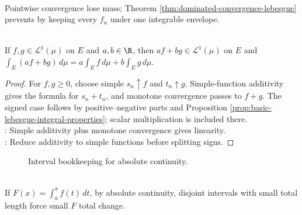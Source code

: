 \begin{perspective} \label{per:domination-as-limit-integral-safeguard} \\
Pointwise convergence lose mass; Theorem \ref{thm:dominated-convergence-lebesgue} prevents by keeping every $f_n$ under one integrable envelope.
\end{perspective}

\begin{proposition} \label{prop:lebesgue-integral-linearity} \\
If $f,g\in\mathscr{L}^1(\mu)$ on $E$ and $a,b\in\R$, then $af+bg\in\mathscr{L}^1(\mu)$ on $E$ and $\int_E(af+bg)\,d\mu=a\int_Ef\,d\mu+b\int_Eg\,d\mu$.
\begin{proof}
For $f,g\geq0$, choose simple $s_n\uparrow f$ and $t_n\uparrow g$. Simple-function additivity gives the formula for $s_n+t_n$, and monotone convergence passes to $f+g$. The signed case follows by positive--negative parts and Proposition \ref{prop:basic-lebesgue-integral-properties}; scalar multiplication is included there.\\
: Simple additivity plus monotone convergence gives linearity.\\
: Reduce additivity to simple functions before splitting signs.
\end{proof}
\end{proposition}

\begin{figure}[H]
  \centering
  
  \caption{Interval bookkeeping for absolute continuity.}
  \label{fig:absolute-continuity-interval-decomposition}
\end{figure}

\begin{perspective} \label{per:absolute-continuity-interval-bookkeeping} \\
If $F(x)=\int_a^x f(t)\,dt$, by absolute continuity, disjoint intervals with small total length force small $F$ total change.\\
\end{perspective}

